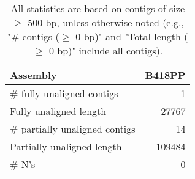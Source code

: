 \documentclass[12pt,a4paper]{article}
\begin{document}
\begin{table}[ht]
\begin{center}
\caption{All statistics are based on contigs of size $\geq$ 500 bp, unless otherwise noted (e.g., "\# contigs ($\geq$ 0 bp)" and "Total length ($\geq$ 0 bp)" include all contigs).}
\begin{tabular}{|l*{1}{|r}|}
\hline
Assembly & B418PP \\ \hline
\# fully unaligned contigs & 1 \\ \hline
Fully unaligned length & 27767 \\ \hline
\# partially unaligned contigs & 14 \\ \hline
Partially unaligned length & 109484 \\ \hline
\# N's & 0 \\ \hline
\end{tabular}
\end{center}
\end{table}
\end{document}
